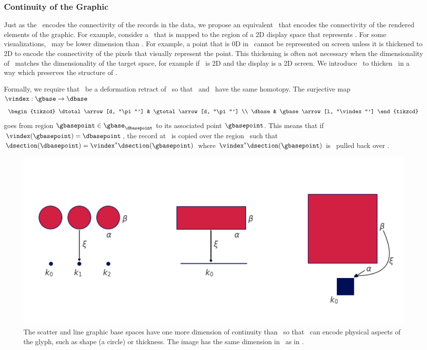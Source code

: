 \documentclass[../main.tex]{subfiles}
\begin{document}
\subsubsection{Continuity of the Graphic \gbase} 
\label{sec:graphic_base}
Just as the \dbase\ encodes the connectivity of the records in the data, we propose an equivalent \gbase\ that encodes the connectivity of the rendered elements of the graphic. For example, consider a \gbase\ that is mapped to the region of a 2D display space that represents \dbase. For some visualizations, \dbase\ may be lower dimension than \gbase. For example, a point that is 0D in \dbase\ cannot be represented on screen unless it is thickened to 2D to encode the connectivity of the pixels that visually represent the point. This thickening is often not necessary when the dimensionality of \dbase\ matches the dimensionality of the target space, for example if \dbase\ is 2D and the display is a 2D screen. We introduce \gbase\ to thicken \dbase\ in a way which preserves the structure of \dbase. 

Formally, we require that \dbase\ be a deformation retract\cite{RetractionTopology2020} of \gbase\ so that \dbase\ and \gbase\ have the same homotopy. The surjective map $\vindex: \gbase \rightarrow \dbase$ 
\begin{equation}
    \begin{tikzcd}
        \dtotal \arrow[d, "\pi"'] & \gtotal \arrow[d, "\pi"'] \\
        \dbase                   & \gbase \arrow[l, "\vindex"']
    \end{tikzcd}
\end{equation}
goes from region $\gbasepoint \in \gbase_{\dbasepoint}$ to its associated point $\gbasepoint$. This means that if $\vindex(\gbasepoint) = \dbasepoint$, the record at \dbasepoint\ is copied over the region \gbasepoint\ such that $\dsection(\dbasepoint)=\vindex^*\dsection(\gbasepoint)$ where $\vindex^*\dsection(\gbasepoint)$  is \dsection\ pulled back over \gbase. 

\begin{figure}[H]
    \includegraphics[width=1\textwidth]{figures/math/retraction_maps.png}
    \caption{The scatter and line graphic base spaces have one more dimension of continuity than \dbase\ so that \gbase\ can encode physical aspects of the glyph, such as shape (a circle) or thickness. The image has the same dimension in \gbase\ as in \dbase.}
    \label{fig:graphic_retraction_map}
\end{figure}
\end{document}
